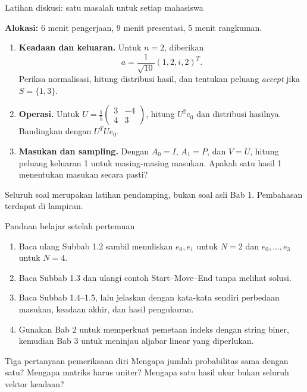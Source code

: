 \documentclass[aspectratio=169,11pt]{beamer}
\begin{document}
\begin{frame}{Latihan diskusi: satu masalah untuk setiap mahasiswa}

\small\textbf{Alokasi:} 6 menit pengerjaan, 9 menit presentasi, 5 menit rangkuman.
\normalsize
\begin{enumerate}
\item \textbf{Keadaan dan keluaran.} Untuk $n=2$, diberikan
\[
 a=\frac1{\sqrt{10}}(1,2,i,2)^T.
\]
Periksa normalisasi, hitung distribusi hasil, dan tentukan peluang \textit{accept} jika $S=\{1,3\}$.
\item \textbf{Operasi.} Untuk $U=\frac15\begin{pmatrix}3&-4\\4&3\end{pmatrix}$, hitung $U^2e_0$ dan distribusi hasilnya. Bandingkan dengan $U^TUe_0$.
\item \textbf{Masukan dan sampling.} Dengan $A_0=I$, $A_1=P$, dan $V=U$, hitung peluang keluaran 1 untuk masing-masing masukan. Apakah satu hasil 1 menentukan masukan secara pasti?
\end{enumerate}
\par\medskip
\small Seluruh soal merupakan latihan pendamping, bukan soal asli Bab 1. Pembahasan terdapat di lampiran.

\end{frame}

\begin{frame}{Panduan belajar setelah pertemuan}

\begin{enumerate}
\item Baca ulang Subbab 1.2 sambil menuliskan $e_0,e_1$ untuk $N=2$ dan $e_0,\ldots,e_3$ untuk $N=4$.
\item Baca Subbab 1.3 dan ulangi contoh Start--Move--End tanpa melihat solusi.
\item Baca Subbab 1.4--1.5, lalu jelaskan dengan kata-kata sendiri perbedaan masukan, keadaan akhir, dan hasil pengukuran.
\item Gunakan Bab 2 untuk memperkuat pemetaan indeks dengan string biner, kemudian Bab 3 untuk meninjau aljabar linear yang diperlukan.
\end{enumerate}
\begin{block}{Tiga pertanyaan pemeriksaan diri}
Mengapa jumlah probabilitas sama dengan satu? Mengapa matriks harus uniter? Mengapa satu hasil ukur bukan seluruh vektor keadaan?
\end{block}

\end{frame}
\end{document}
